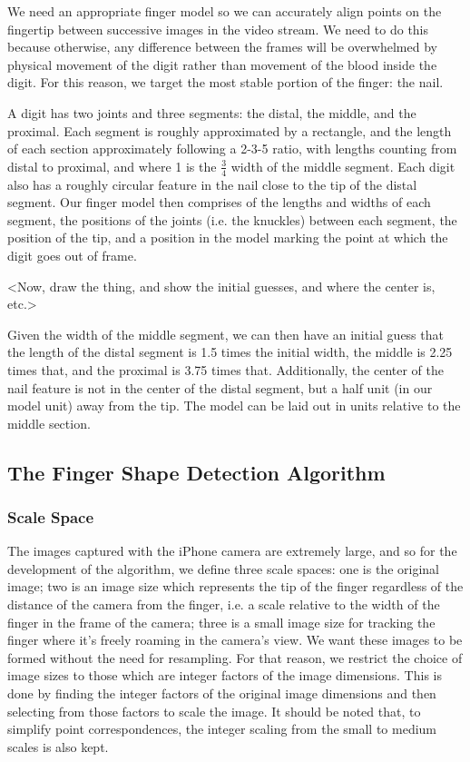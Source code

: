 We need an appropriate finger model so we can accurately align points on the fingertip between successive images in the video stream. We need to do this because otherwise, any difference between the frames will be overwhelmed by physical movement of the digit rather than movement of the blood inside the digit. For this reason, we target the most stable portion of the finger: the nail.

A digit has two joints and three segments: the distal, the middle, and the proximal. Each segment is roughly approximated by a rectangle, and the length of each section approximately following a 2-3-5 ratio, with lengths counting from distal to proximal, and where 1 is the $\frac{3}{4}$ width of the middle segment. Each digit also has a roughly circular feature in the nail close to the tip of the distal segment. Our finger model then comprises of the lengths and widths of each segment, the positions of the joints (i.e. the knuckles) between each segment, the position of the tip, and a position in the model marking the point at which the digit goes out of frame. 

<Now, draw the thing, and show the initial guesses, and where the center is, etc.> 

Given the width of the middle segment, we can then have an initial guess that the length of the distal segment is 1.5 times the initial width, the middle is 2.25 times that, and the proximal is 3.75 times that. Additionally, the center of the nail feature is not in the center of the distal segment, but a half unit (in our model unit) away from the tip. The model can be laid out in units relative to the middle section.
\subsection{The Finger Shape Detection Algorithm}\label{sec:FingerShapeDetectionAlgorithm}

\subsubsection{Scale Space}\label{sec:ScaleSpace}
The images captured with the iPhone camera are extremely large, and so for the development of the algorithm, we define three scale spaces: one is the original image; two is an image size which represents the tip of the finger regardless of the distance of the camera from the finger, i.e. a scale relative to the width of the finger in the frame of the camera; three is a small image size for tracking the finger where it's freely roaming in the camera's view. We want these images to be formed without the need for resampling. For that reason, we restrict the choice of image sizes to those which are integer factors of the image dimensions. This is done by finding the integer factors of the original image dimensions and then selecting from those factors to scale the image. It should be noted that, to simplify point correspondences, the integer scaling from the small to medium scales is also kept.

